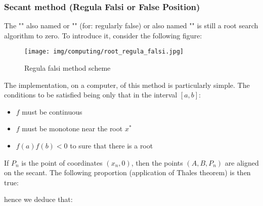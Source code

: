 	\pagebreak
	\subsubsection{Secant method (Regula Falsi or False Position)}
	The "" also named or "" (for: regularly false) or also named "" is still a root search algorithm to zero. To introduce it, consider the following figure:
	\begin{figure}[H]
		\centering
		\texttt{[image: img/computing/root\_regula\_falsi.jpg]}
		\caption{Regula falsi method scheme}
	\end{figure}
	The implementation, on a computer, of this method is particularly simple. The conditions to be satisfied being only that in the interval $[a,b]$:
	\begin{itemize}
		\item $f$ must be continuous

		\item $f$ must be monotone near the root $x^{*}$
		
		\item $f(a)f(b)<0$ to sure that there is a root
	\end{itemize}
	If $P_n$ is the point of coordinates $(x_n,0)$, then the points $(A,B,P_n)$ are aligned on the secant. The following proportion (application of Thales theorem) is then true:
	
	hence we deduce that:
	
